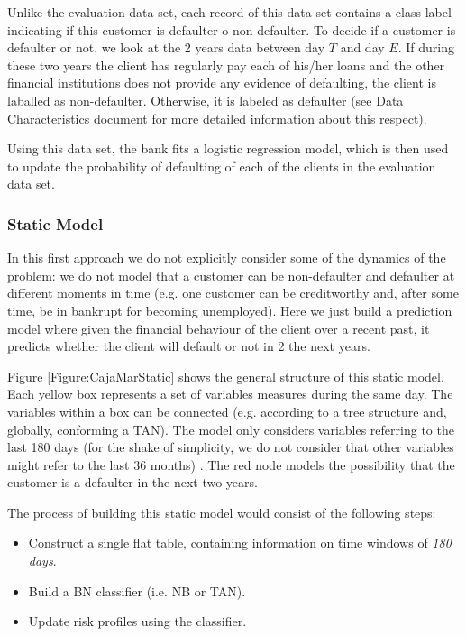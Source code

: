 \begin{itemize}
Unlike the evaluation data set, each record of this data set contains a class label indicating if this customer is defaulter o non-defaulter. To decide if a customer is defaulter or not, we look at the 2 years data between day $T$ and day $E$. If during these two years the client has regularly pay each of his/her loans and the other financial institutions does not provide any evidence of defaulting, the client is laballed as non-defaulter. Otherwise, it is labeled as defaulter (see Data Characteristics document for more detailed information about this respect).   

Using this data set, the bank fits a logistic regression model, which is then used to update the probability of defaulting of each of the clients in the evaluation data set. 

\end{itemize}
 

\subsubsection*{Static Model} 

In this first approach we do not explicitly consider some of the dynamics of the problem: we do not model that a customer can be non-defaulter and defaulter at different moments in time (e.g. one customer can be creditworthy and, after some time, be in bankrupt for becoming unemployed). Here we just build a prediction model where given the financial behaviour of the client over a recent past, it predicts whether the client will default or not in 2 the next years. 

Figure \ref{Figure:CajaMarStatic} shows the general structure of this static model. Each yellow box represents a set of variables measures during the same day.
The variables within a box can be connected (e.g. according to a tree structure and, globally, conforming a TAN). The model only considers variables referring to the last 180 days (for the shake of simplicity, we do not consider that other variables might refer to the last 36 months) . The red node models the possibility that the customer is a defaulter in the next two years. 

The process of building this static model would consist of the following steps:


\begin{itemize}
\item Construct a single flat table, containing information on time windows of \emph{180 days}.
\item Build a BN classifier (i.e. NB or TAN). 
\item Update risk profiles using the classifier.
\end{itemize}


